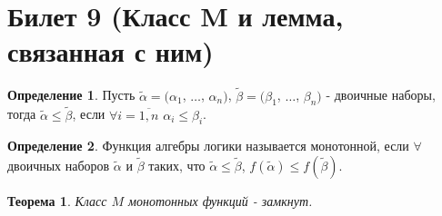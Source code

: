 \documentclass[a4paper, 12pt]{article}
\theoremstyle{definition}
\newtheorem*{definition}{Определение}
\theoremstyle{plain}
\newtheorem*{theorem}{Теорема}
\theoremstyle{remark}
\begin{document}
  \section{Билет 9 (Класс M и лемма, связанная с ним)}
  \begin{definition}
    Пусть $\tilde{\alpha}=(\alpha_1$, $\ldots$, $\alpha_n)$, $\tilde{\beta}=(\beta_1$, $\ldots$, $\beta_n)$ - двоичные наборы, тогда $\tilde{\alpha}\leqslant\tilde{\beta}$, если $\forall i=\overline{1,n}$ $\alpha_i\leqslant\beta_i$.
  \end{definition}
  \begin{definition}
    Функция алгебры логики называется монотонной, если $\forall$ двоичных наборов $\tilde{\alpha}$ и $\tilde{\beta}$ таких, что $\tilde{\alpha}\leqslant\tilde{\beta}$, $f(\tilde{\alpha})\leqslant f(\tilde{\beta})$.
  \end{definition}
  \begin{theorem}
    Класс $M$ монотонных функций - замкнут.
  \end{theorem}
\end{document}
